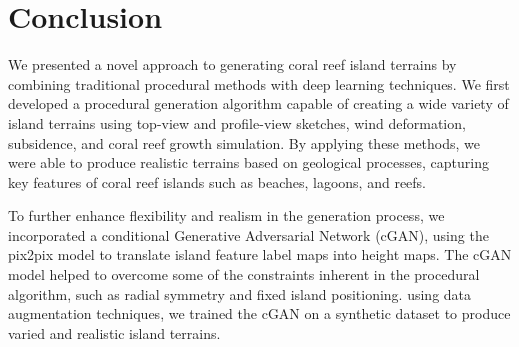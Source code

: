 \section{Conclusion}

We presented a novel approach to generating coral reef island terrains by combining traditional procedural methods with deep learning techniques. We first developed a procedural generation algorithm capable of creating a wide variety of island terrains using top-view and profile-view sketches, wind deformation, subsidence, and coral reef growth simulation. By applying these methods, we were able to produce realistic terrains based on geological processes, capturing key features of coral reef islands such as beaches, lagoons, and reefs.

To further enhance flexibility and realism in the generation process, we incorporated a conditional Generative Adversarial Network (cGAN), using the pix2pix model to translate island feature label maps into height maps. The cGAN model helped to overcome some of the constraints inherent in the procedural algorithm, such as radial symmetry and fixed island positioning. using data augmentation techniques, we trained the cGAN on a synthetic dataset to produce varied and realistic island terrains.






